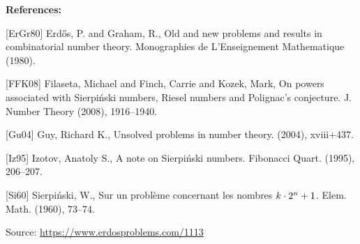 \documentclass{article}
\begin{document}
\bigskip
\noindent\textbf{References:}

[ErGr80] Erd\H{o}s, P. and Graham, R., Old and new problems and results in combinatorial number theory. Monographies de L'Enseignement Mathematique (1980).
 
 [FFK08] Filaseta, Michael and Finch, Carrie and Kozek, Mark, On powers associated with Sierpi\'nski numbers, {R}iesel
numbers and {P}olignac's conjecture. J. Number Theory (2008), 1916--1940.
 
 [Gu04] Guy, Richard K., Unsolved problems in number theory. (2004), xviii+437.
 
 [Iz95] Izotov, Anatoly S., A note on Sierpi\'nski numbers. Fibonacci Quart. (1995), 206--207.
 
 [Si60] Sierpi\'nski, W., Sur un probl\`eme concernant les nombres {$k\cdot 2\sp{n}+1$}. Elem. Math. (1960), 73--74.

\bigskip
\noindent\small{Source: \url{https://www.erdosproblems.com/1113}}
\end{document}
